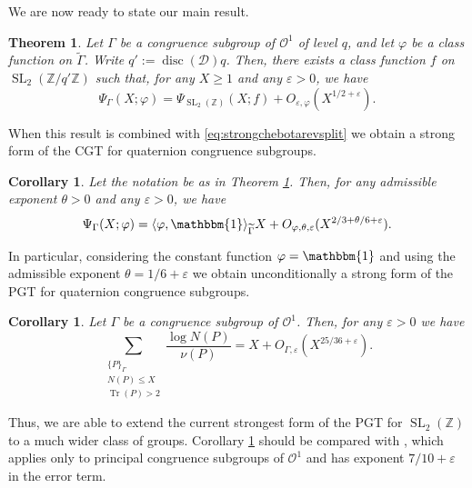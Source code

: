 \documentclass{article}
\newtheorem{thm}[lem]{Theorem}
\newtheorem{cor}[lem]{Corollary}
\theoremstyle{named}
\newcommand{\D}{\mathcal{D}}
\newcommand{\Z}{\mathbb{Z}}
\newcommand{\N}{\mathcal{N}}
\renewcommand{\O}{\mathcal{O}}
\DeclareMathOperator{\SL}{SL}
\DeclareMathOperator{\disc}{disc}
\DeclareMathOperator{\Tr}{Tr}
\begin{document}
We are now ready to state our main result.

\begin{thm}\label{thm:classicalmatching}
Let $\Gamma$ be a congruence subgroup of $\O^1$ of level $q$, and let $\varphi$ be a class function on $\widetilde{\Gamma}$. Write $q' := \disc(\D) q$. Then, there exists a class function $f$ on $\SL_2(\Z/q'\Z)$ such that, for any $X \geq 1$ and any $\varepsilon > 0$, we have
\begin{equation*}
    \Psi_{\Gamma}(X; \varphi) = \Psi_{\SL_2(\Z)}(X; f) + O_{\varepsilon, \varphi}(X^{1/2 + \varepsilon}).
\end{equation*}
\end{thm}

When this result is combined with \eqref{eq:strongchebotarevsplit} we obtain a strong form of the CGT for quaternion congruence subgroups.

\begin{cor}\label{cor:nonsplitchebotarev}
Let the notation be as in Theorem \ref{thm:classicalmatching}. Then, for any admissible exponent $\theta > 0$ and any $\varepsilon > 0$, we have
\begin{equation*}
    \Psi_{\Gamma}(X; \varphi) = \langle \varphi, \mathbbm{1}\rangle_{\widetilde{\Gamma}} X + O_{\varphi, \theta, \varepsilon}(X^{2/3 + \theta/6 + \varepsilon}).
\end{equation*}
\end{cor}
In particular, considering the constant function $\varphi = \mathbbm{1}$ and using the admissible exponent $\theta = 1/6 + \varepsilon$ we obtain unconditionally a strong form of the PGT for quaternion congruence subgroups.  

\begin{cor}\label{cor:primegeodesicquaternion}
Let $\Gamma$ be a congruence subgroup of $\O^1$. Then, for any $\varepsilon > 0$ we have
\begin{equation*}
    [\{\pm I\} \Gamma: \Gamma]\sum_{\substack{\{P\}_{\Gamma}\\N(P)\leq X\\
    \Tr(P) > 2}}\frac{\log N(P)}{\nu(P)} = X + O_{\Gamma, \varepsilon}(X^{25/36 + \varepsilon}).
\end{equation*}
\end{cor}

Thus, we are able to extend the current strongest form of the PGT for $\SL_2(\Z)$ to a much wider class of groups. Corollary \ref{cor:primegeodesicquaternion} should be compared with \cite[Theorem 1.1]{tang2025}, which applies only to principal congruence subgroups of $\O^1$ and has exponent $7/10 + \varepsilon$ in the error term.
\end{document}
